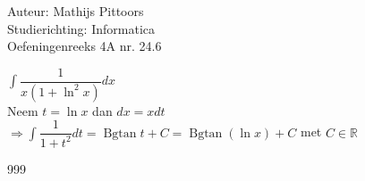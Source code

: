 \documentclass[a4paper]{article}
\newcommand{\intt}{\displaystyle\int}
\newcommand{\Bgtan}{\operatorname{Bgtan}}
\begin{document}
  
\noindent \large Auteur: Mathijs Pittoors \\
\noindent \large Studierichting: Informatica\\
\noindent \large Oefeningenreeks 4A nr. 24.6\\

\medskip

\normalsize

$\intt \dfrac{1}{x(1+\ln^2x)}dx$\\

Neem $t = \ln x$ dan $dx = xdt$\\

$\Rightarrow \intt \dfrac{1}{1+t^2}dt = \Bgtan t + C = \Bgtan (\ln x) + C$ met $C \in \mathbb{R}$\\

\begin{thebibliography}{999}
\end{thebibliography}
\end{document}
